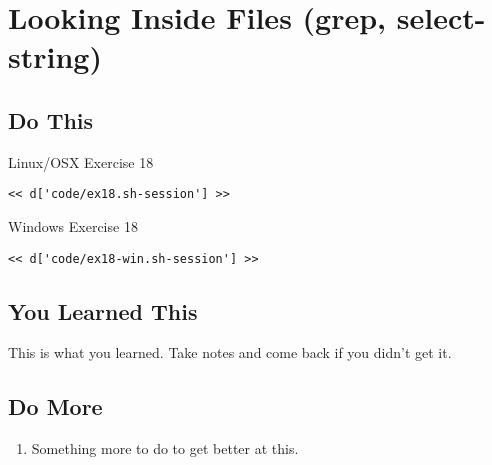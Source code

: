 \chapter{Looking Inside Files (grep, select-string)}

\section{Do This}

\begin{code}{Linux/OSX Exercise 18}
\begin{Verbatim}
<< d['code/ex18.sh-session'] >>
\end{Verbatim}
\end{code}

\begin{code}{Windows Exercise 18}
\begin{Verbatim}
<< d['code/ex18-win.sh-session'] >>
\end{Verbatim}
\end{code}

\section{You Learned This}

This is what you learned.  Take notes and come back if you didn't get it.

\section{Do More}

\begin{enumerate}
\item Something more to do to get better at this.
\end{enumerate}


